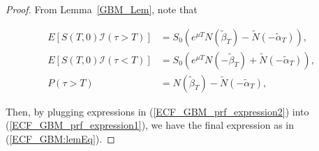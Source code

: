 \documentclass[11pt]{article}
\newtheorem{lemma}{Lemma}
\theoremstyle{plain}
\numberwithin{equation}{section}
\begin{document}
{{{\begin{proof}
	
	

From Lemma~\ref{GBM_Lem}, note that 

\begin{equation}
	 \begin{aligned}
 	E[S(T,0) \mathcal{I}(\tau >T)] &=S_0 \left( e^{\mu T} N\left( \tilde{\beta}_T \right)-\tilde{N}\left(-\tilde{\alpha}_T \right)  \right), \\ 
 	E[S(T,0) \mathcal{I}(\tau < T)] &=S_0 \left( e^{\mu T} N\left( -\tilde{\beta}_T \right)+\tilde{N}\left(-\tilde{\alpha}_T \right) \right)  ,\\ 
 	P(\tau >T)&=N\left( \tilde{\beta}_T \right)- \tilde{N}\left( -\tilde{\alpha}_T \right),
 \end{aligned}
 \label{ECF_GBM_prf_expression2}
\end{equation}


%
Then, by plugging expressions in  (\ref{ECF_GBM_prf_expression2}) into (\ref{ECF_GBM_prf_expression1}), we have the final expression as in (\ref{ECF_GBM:lemEq}).

	
	
	
\end{proof}

}
%
%
%
%

}}
\end{document}
